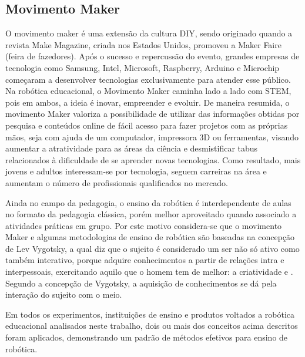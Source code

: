 \subsection{Movimento Maker}\label{sec:maker} 
O movimento maker é uma extensão da cultura DIY, sendo originado quando a revista Make Magazine, criada nos Estados Unidos, promoveu a Maker Faire (feira de fazedores). Após o sucesso e repercussão do evento, grandes empresas de tecnologia como Samsung, Intel, Microsoft, Raspberry, Arduino e Microchip começaram a desenvolver tecnologias exclusivamente para atender esse público. Na robótica educacional, o Movimento Maker caminha lado a lado com STEM, pois em ambos, a ideia é inovar, empreender e evoluir. De maneira resumida, o movimento Maker valoriza a possibilidade de utilizar das informações obtidas por pesquisa e conteúdos online de fácil acesso para fazer projetos com as próprias mãos, seja com ajuda de um computador, impressora 3D ou ferramentas, visando aumentar a
atratividade para as áreas da ciência e desmistificar tabus relacionados à dificuldade de se aprender novas tecnologias. Como resultado, mais jovens e adultos interessam-se por tecnologia, seguem carreiras na área e aumentam o número de
profissionais qualificados no mercado.

Ainda no campo da pedagogia, o ensino da robótica é interdependente de
aulas no formato da pedagogia clássica, porém melhor aproveitado quando associado a atividades práticas em grupo. Por este motivo considera-se que o movimento Maker e algumas metodologias de ensino de robótica são baseadas na concepção de Lev Vygotsky, a qual diz que o sujeito é considerado um ser não só ativo como também interativo, porque adquire conhecimentos a partir de relações intra e interpessoais, exercitando aquilo que o homem tem de melhor: a criatividade \cite{palangana} e \cite{rocha}. 
Segundo a concepção de Vygotsky, a aquisição de conhecimentos se dá pela interação do sujeito com o meio.



Em todos os experimentos, instituições de ensino e produtos voltados a robótica educacional  analisados neste trabalho, dois ou mais dos conceitos acima descritos foram aplicados, demonstrando um padrão de métodos efetivos para ensino de robótica.



